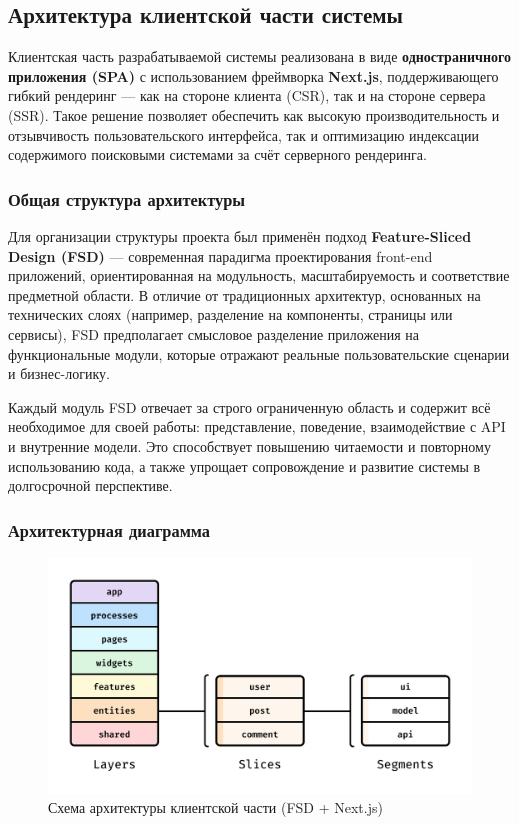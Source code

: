 \subsection{Архитектура клиентской части системы}

Клиентская часть разрабатываемой системы реализована в виде \textbf{одностраничного приложения (SPA)} с использованием фреймворка \textbf{Next.js}, поддерживающего гибкий рендеринг — как на стороне клиента (CSR), так и на стороне сервера (SSR). Такое решение позволяет обеспечить как высокую производительность и отзывчивость пользовательского интерфейса, так и оптимизацию индексации содержимого поисковыми системами за счёт серверного рендеринга.

\subsubsection{Общая структура архитектуры}

Для организации структуры проекта был применён подход \textbf{Feature-Sliced Design (FSD)} — современная парадигма проектирования front-end приложений, ориентированная на модульность, масштабируемость и соответствие предметной области. В отличие от традиционных архитектур, основанных на технических слоях (например, разделение на компоненты, страницы или сервисы), FSD предполагает смысловое разделение приложения на функциональные модули, которые отражают реальные пользовательские сценарии и бизнес-логику.

Каждый модуль FSD отвечает за строго ограниченную область и содержит всё необходимое для своей работы: представление, поведение, взаимодействие с API и внутренние модели. Это способствует повышению читаемости и повторному использованию кода, а также упрощает сопровождение и развитие системы в долгосрочной перспективе.

\subsubsection{Архитектурная диаграмма}

\begin{figure}[H]
  \centering
  \includegraphics[width=0.7\linewidth]{static/fsdImage}
  \caption{Схема архитектуры клиентской части (FSD + Next.js)}
\end{figure}

